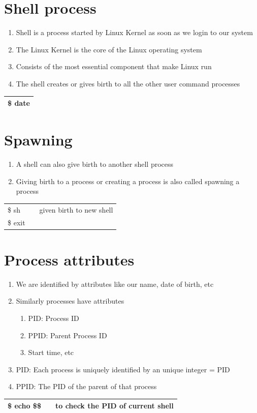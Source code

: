 \documentclass[12pt, a4paper]{report}
\begin{document}
\section{Shell process}
\begin{enumerate}
\item Shell is a process started by Linux Kernel as soon as we login to our system
\item The Linux Kernel is the core of the Linux operating system
\item Consists of the most essential component  that make Linux run
\item The shell creates or gives birth to all the other user command processes
\end{enumerate}
\begin{tabular}{|l|}\hline
\$ date \\ \hline
\end{tabular}
\section{Spawning}
\begin{enumerate}
\item A shell can also give birth to another shell process
\item Giving birth to a process or creating a process is also called spawning a process
\end{enumerate}
\begin{tabular}{|lcr|}\hline
\$ sh && given birth to new shell\\
\$ exit && \\ \hline
\end{tabular}
\section{Process attributes}
\begin{enumerate}
\item We are identified by attributes like our name, date of birth, etc
\item Similarly processes have attributes
\begin{enumerate}
\item PID: Process ID
\item PPID: Parent Process ID
\item Start time, etc
\end{enumerate}
\item PID: Each process is uniquely identified by an unique integer = PID
\item PPID: The PID of the parent of that process
\end{enumerate}
\begin{tabular}{|lcr|}\hline
\$ echo \$\$ && to check the PID of current shell\\ \hline
\end{tabular}
\end{document}
